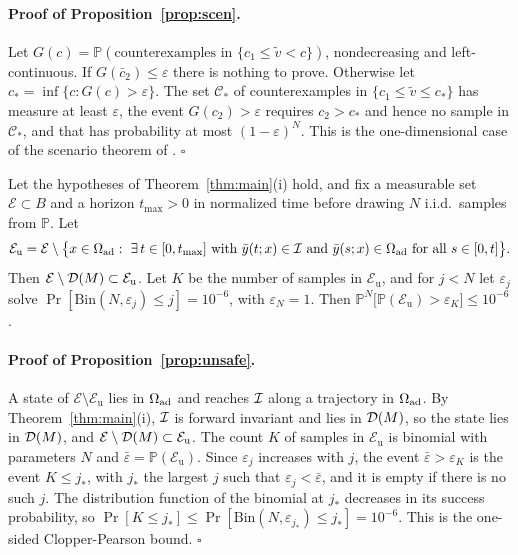 \paragraph{Proof of Proposition~\ref{prop:scen}.} Let $G(c)=\mathbb P(\text{counterexamples in }\{c_1\le\tilde v<c\})$, nondecreasing and left-continuous. If $G(\bar c_2)\le\varepsilon$ there is nothing to prove. Otherwise let $c_*=\inf\{c:G(c)>\varepsilon\}$. The set $\mathcal C_*$ of counterexamples in $\{c_1\le\tilde v\le c_*\}$ has measure at least $\varepsilon$, the event $G(c_2)>\varepsilon$ requires $c_2>c_*$ and hence no sample in $\mathcal C_*$, and that has probability at most $(1-\varepsilon)^N$. This is the one-dimensional case of the scenario theorem of \citet{campi2008}. \hfill$\square$

\begin{proposition}\label{prop:unsafe}
Let the hypotheses of Theorem~\ref{thm:main}(i) hold, and fix a measurable set $\mathcal E\subset B$ and a horizon $t_{\max}>0$ in normalized time before drawing $N$ i.i.d.\ samples from $\mathbb P$. Let
\[
\mathcal E_{\mathrm u}=\mathcal E\setminus\big\{x\in\Oad:\ \exists\,t\in[0,t_{\max}]\ \text{with}\ \bar y(t;x)\in\I\ \text{and}\ \bar y(s;x)\in\Oad\ \text{for all}\ s\in[0,t]\big\}.
\]
Then $\mathcal E\setminus\mathcal D(M)\subset\mathcal E_{\mathrm u}$. Let $K$ be the number of samples in $\mathcal E_{\mathrm u}$, and for $j<N$ let $\varepsilon_j$ solve $\Pr[\mathrm{Bin}(N,\varepsilon_j)\le j]=10^{-6}$, with $\varepsilon_N=1$. Then $\mathbb P^N\big[\mathbb P(\mathcal E_{\mathrm u})>\varepsilon_K\big]\le10^{-6}$.
\end{proposition}

\paragraph{Proof of Proposition~\ref{prop:unsafe}.} A state of $\mathcal E\setminus\mathcal E_{\mathrm u}$ lies in $\Omega_{\mathrm{ad}}$ and reaches $\mathcal I$ along a trajectory in $\Omega_{\mathrm{ad}}$. By Theorem~\ref{thm:main}(i), $\mathcal I$ is forward invariant and lies in $\mathcal D(M)$, so the state lies in $\mathcal D(M)$, and $\mathcal E\setminus\mathcal D(M)\subset\mathcal E_{\mathrm u}$. The count $K$ of samples in $\mathcal E_{\mathrm u}$ is binomial with parameters $N$ and $\bar\varepsilon=\mathbb P(\mathcal E_{\mathrm u})$. Since $\varepsilon_j$ increases with $j$, the event $\bar\varepsilon>\varepsilon_K$ is the event $K\le j_*$, with $j_*$ the largest $j$ such that $\varepsilon_j<\bar\varepsilon$, and it is empty if there is no such $j$. The distribution function of the binomial at $j_*$ decreases in its success probability, so $\Pr[K\le j_*]\le\Pr[\mathrm{Bin}(N,\varepsilon_{j_*})\le j_*]=10^{-6}$. This is the one-sided Clopper-Pearson bound. \hfill$\square$

